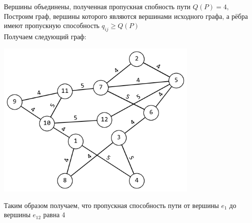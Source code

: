 \documentclass[12pt,a4paper]{report}
\begin{document}
\pagebreak
Вершины объединены, полученная пропускная спобность пути $Q(P)=4$,\\
Построим граф, вершины которого являются вершинами исходного графа, 
а рёбра имеют пропускную способность $q_{ij}\geq Q(P)$\\
Получаем следующий граф:\\
\begin{center}
    \includegraphics*[width=10cm]{graph_4.png}
\end{center}
Таким образом получаем, что пропускная способность пути от вершины $e_1$ до вершины $e_{12}$ равна 4
\end{document}
